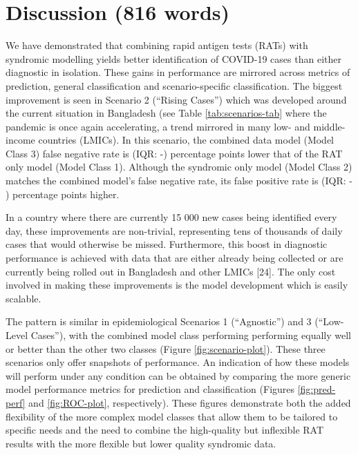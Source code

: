 \documentclass[]{elsarticle} %
\begin{document}
\hypertarget{discussion-816-words}{%
\section{Discussion (816 words)}\label{discussion-816-words}}

We have demonstrated that combining rapid antigen tests (RATs) with syndromic modelling yields better identification of COVID-19 cases than either diagnostic in isolation.
These gains in performance are mirrored across metrics of prediction, general classification and scenario-specific classification.
The biggest improvement is seen in Scenario 2 (``Rising Cases'') which was developed around the current situation in Bangladesh (see Table \ref{tab:scenarios-tab} where the pandemic is once again accelerating, a trend mirrored in many low- and middle- income countries (LMICs).
In this scenario, the combined data model (Model Class 3) false negative rate is  (IQR: -) percentage points lower that of the RAT only model (Model Class 1).
Although the syndromic only model (Model Class 2) matches the combined model's false negative rate, its false positive rate is  (IQR: - ) percentage points higher.

In a country where there are currently 15 000 new cases being identified every day, these improvements are non-trivial, representing tens of thousands of daily cases that would otherwise be missed.
Furthermore, this boost in diagnostic performance is achieved with data that are either already being collected or are currently being rolled out in Bangladesh and other LMICs {[}24{]}.
The only cost involved in making these improvements is the model development which is easily scalable.

The pattern is similar in epidemiological Scenarios 1 (``Agnostic'') and 3 (``Low-Level Cases''), with the combined model class performing performing equally well or better than the other two classes (Figure \ref{fig:scenario-plot}).
These three scenarios only offer snapshots of performance.
An indication of how these models will perform under any condition can be obtained by comparing the more generic model performance metrics for prediction and classification (Figures \ref{fig:pred-perf} and \ref{fig:ROC-plot}, respectively).
These figures demonstrate both the added flexibility of the more complex model classes that allow them to be tailored to specific needs and the need to combine the high-quality but inflexible RAT results with the more flexible but lower quality syndromic data.
\end{document}
